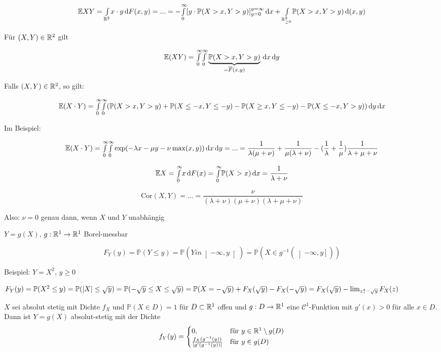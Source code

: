 \documentclass{cheat-sheet}
\renewcommand{\P}{\mathbb{P}} %
\newcommand{\E}{\mathbb{E}} %
\newcommand{\cor}{\mathrm{Cor}} %
\begin{document}
\[ \E XY = \Int{\R^2}{}{x \cdot y}{F(x,y)} = ... = - \Int{0}{\infty}{[y \cdot \P(X > x, Y > y)]_{y=0}^{y=\infty}}{x} + \Int{\R_{\geq 0}^2}{}{\P(X > x, Y > y)}{(x,y)} \]

Für $(X, Y) \in \mathbb{R}^2$ gilt

\[ \E (XY) = \Int{0}{\infty}{\Int{0}{\infty}{\underbrace{\P(X > x, Y > y)}_{= \overline{F}(x,y)}}{x}}{y} \]

Falls $(X, Y) \in \mathbb{R}^2$, so gilt:

\[ \E (X \cdot Y) = \Int{0}{\infty}{\Int{0}{\infty}{(\P(X > x, Y > y) + \P(X \leq -x, Y \leq -y) - \P(X \geq x, Y \leq -y) - \P(X \leq -x, Y > y))}{y}}{x} \]

Im Beispiel:

\[ \E (X \cdot Y) = \Int{0}{\infty}{\Int{0}{\infty}{\exp(-\lambda x - \mu y - \nu \max(x,y))}{x}}{y} = ... = \frac{1}{\lambda (\mu + \nu)} + \frac{1}{\mu (\lambda + \nu)} - (\frac{1}{\lambda} + \frac{1}{\mu}) \frac{1}{\lambda + \mu + \nu} \]

\[ \E X = \Int{0}{\infty}{x}{F(x)} = \Int{0}{\infty}{\P(X > x)}{x} = \frac{1}{\lambda + \nu} \]

\[ \cor(X,Y) = ... = \frac{\nu}{(\lambda + \nu) (\mu + \nu) (\lambda + \mu + \nu)} \]

Also: $\nu = 0$ genau dann, wenn $X$ und $Y$ unabhängig



$Y = g(X)$, $g : \mathbb{R}^1 \to \mathbb{R}^1$ Borel-messbar

\[ F_Y(y) = \P(Y \leq y) = \P(Y in \left] -\infty, y \right[) = \P(X \in g^{-1}(\left] -\infty, y \right])) \]

Beispiel: $Y = X^2$, $y \geq 0$

$F_Y(y) = \P(X^2 \leq y) = \P(\abs{X} \leq \sqrt{y}) = \P(-\sqrt{y} \leq X \leq \sqrt{y}) = \P(X = -\sqrt{y}) + F_X(\sqrt{y}) - F_X(-\sqrt{y}) = F_X(\sqrt{y}) - \lim_{z \uparrow -\sqrt{y}} F_X(z)$

\begin{satz}
  $X$ sei absolut stetig mit Dichte $f_X$ und $\P(X \in D) = 1$ für $D \subset \mathbb{R}^1$ offen und $g : D \to \mathbb{R}^1$ eine $\mathcal{C}^1$-Funktion mit $g'(x) > 0$ für alle $x \in D$. Dann ist $Y = g(X)$ absolut-stetig mit der Dichte
  \[ f_Y(y) = \begin{cases} 0, & \text{für } y \in \mathbb{R}^1 \setminus g(D) \\ \frac{f_X(g^{-1}(y))}{\lvert g'(g^{-1}(y))\rvert} & \text{für } y \in g(D) \end{cases} \]
\end{satz}
\end{document}
